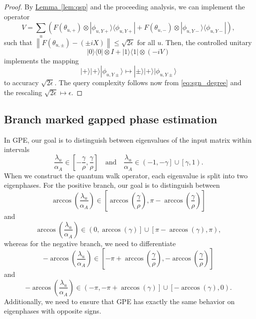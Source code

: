 \documentclass[letterpaper,onecolumn,11pt,accepted=2026-02-14]{quantumarticle}
\newcommand{\norm}[1]{\left\lVert#1\right\rVert}
\theoremstyle{remark}
\theoremstyle{plain}
\newcommand{\eq}[1]{\cref{eq:#1}}
\newcommand{\lem}[1]{\hyperref[lem:#1]{Lemma~\ref*{lem:#1}}}
\newcommand{\ket}[1]{|#1\rangle}
\newcommand{\bra}[1]{\langle#1|}
\newcommand{\ketbra}[2]{\ket{#1}\!\bra{#2}}
\begin{document}
\begin{proof}
By \lem{qsp} and the proceeding analysis, we can implement the operator
\begin{equation}
    V=\sum_{u} \left(F(\theta_{u,+})\otimes\ketbra{\phi_{u,Y+}}{\phi_{u,Y+}}
    +F(\theta_{u,-})\otimes\ketbra{\phi_{u,Y-}}{\phi_{u,Y-}}\right),
\end{equation}
such that $\norm{F(\theta_{u,\pm})-\left(\pm iX\right)}\leq\sqrt{2\epsilon}$ for all $u$.
Then, the controlled unitary
\begin{equation}
    \ketbra{0}{0}\otimes I+\ketbra{1}{1}\otimes (-iV)
\end{equation}
implements the mapping
\begin{equation}
    \ket{+}\ket{+}\ket{\phi_{u,Y\pm}}\mapsto
        \ket{\pm}\ket{+}\ket{\phi_{u,Y\pm}}
\end{equation}
to accuracy $\sqrt{2\epsilon}$. The query complexity follows now from \eq{sgn_degree} and the rescaling $\sqrt{2\epsilon}\mapsto\epsilon$.
\end{proof}


\subsection{Branch marked gapped phase estimation}
\label{append:gpe_bm_gpe}
In GPE, our goal is to distinguish between eigenvalues of the input matrix within intervals
\begin{equation}
    \frac{\lambda_u}{\alpha_A}\in\left[-\frac{\gamma}{\rho},\frac{\gamma}{\rho}\right]\quad\text{and}\quad
    \frac{\lambda_u}{\alpha_A}\in\left(-1,-\gamma\right]\cup\left[\gamma,1\right).
\end{equation}
When we construct the quantum walk operator, each eigenvalue is split into two eigenphases. For the positive branch, our goal is to distinguish between
\begin{equation}
    \arccos\left(\frac{\lambda_u}{\alpha_A}\right)\in\left[\arccos\left(\frac{\gamma}{\rho}\right),\pi-\arccos\left(\frac{\gamma}{\rho}\right)\right]
\end{equation}
and
\begin{equation}
    \arccos\left(\frac{\lambda_u}{\alpha_A}\right)\in\left(0,\arccos(\gamma)\right]\cup\left[\pi-\arccos(\gamma),\pi\right),
\end{equation}
whereas for the negative branch, we need to differentiate 
\begin{equation}
    -\arccos\left(\frac{\lambda_u}{\alpha_A}\right)\in\left[-\pi+\arccos\left(\frac{\gamma}{\rho}\right),-\arccos\left(\frac{\gamma}{\rho}\right)\right]
\end{equation}
and
\begin{equation}
    -\arccos\left(\frac{\lambda_u}{\alpha_A}\right)\in\left(-\pi,-\pi+\arccos(\gamma)\right]\cup\left[-\arccos(\gamma),0\right).
\end{equation}
Additionally, we need to ensure that GPE has exactly the same behavior on eigenphases with opposite signs.
\end{document}
